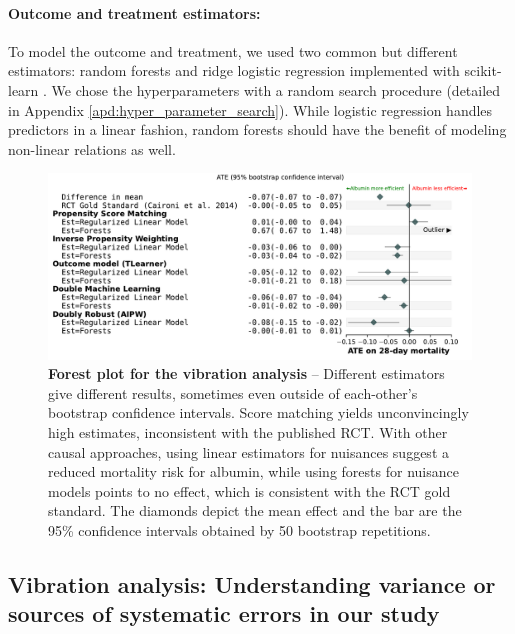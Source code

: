 \documentclass[french,12pt,twoside,a4paper]{book}
\begin{document}
\paragraph{Outcome and treatment estimators:}

To model the outcome and treatment, we used two common but different estimators:
random forests and ridge logistic regression implemented with scikit-learn
\citep{pedregosa2011scikit}. We chose the hyperparameters with a random search
procedure (detailed in Appendix \ref{apd:hyper_parameter_search}). While
logistic regression handles predictors in a linear fashion, random forests
should have the benefit of modeling non-linear relations as well.

\begin{figure}[h!]
  \centering
  \includegraphics[width=\linewidth]{img/chapter_4/albumin_for_sepsis__obs_1d__estimates_20230712__est_lr_rf__bs_50.pdf}
  \caption{\textbf{Forest plot for the vibration analysis} -- Different
    estimators give different results, sometimes even outside of
    each-other's bootstrap confidence intervals. Score matching yields
    unconvincingly high estimates, inconsistent with the published RCT.
    With other causal approaches, using linear estimators for nuisances
    suggest a reduced mortality risk for albumin, while using forests for
    nuisance models points to no effect, which is consistent with the RCT gold standard.
    The diamonds
    depict the mean effect and the bar are the 95\% confidence intervals
    obtained by 50 bootstrap repetitions.}\label{fig:albumin_for_sepsis:results}
\end{figure}

\subsection{Vibration analysis: Understanding variance or sources of
  systematic errors in our study}\label{subsec:causal_tuto:vibration_mimic}
\end{document}
